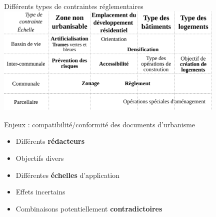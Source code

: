 \documentclass[xcolor=table]{beamer}
\begin{document}
\begin{frame}{Différents types de contraintes réglementaires} 
	\includegraphics[width=11cm]{Images/synthese-doc.png}
\end{frame}

\begin{frame}{Enjeux : compatibilité/conformité des documents d'urbanisme}
	\begin{itemize}
		\item Différents \textbf{rédacteurs}
		\item Objectifs divers
		\item Différentes \textbf{échelles} d'application
		\item Effets incertains 
		\item Combinaisons potentiellement \textbf{contradictoires}
	\end{itemize}
\end{frame}
\end{document}
